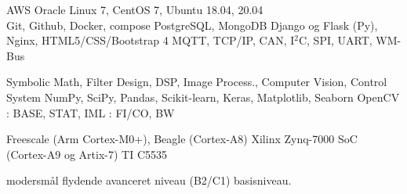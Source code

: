 \documentclass[a4paper]{janus-resume}
\begin{document}
\begin{minipage}[t]{0.49\textwidth}
AWS
\bluebullet{} Oracle Linux 7, CentOS 7, Ubuntu 18.04, 20.04 \\
\bluebullet{} Git, Github, Docker, compose
\bluebullet{} PostgreSQL, MongoDB
\bluebullet{} Django og Flask (Py), Nginx, HTML5/CSS/Bootstrap 4
\bluebullet{} MQTT, TCP/IP, CAN, I$^2$C, SPI, UART, WM-Bus
\sectionspace %

 Symbolic Math, Filter Design, DSP, Image Process., Computer Vision, Control System
\bluebullet {} NumPy, SciPy, Pandas, Scikit-learn, Keras, Matplotlib, Seaborn
\bluebullet {} OpenCV
\bluebullet {}: BASE, STAT, IML
\bluebullet {}: FI/CO, BW 
\sectionspace %

Freescale (Arm Cortex-M0+), Beagle (Cortex-A8)
\bluebullet{} Xilinx Zynq-7000 SoC (Cortex-A9 og Artix-7)
\bluebullet{} TI C5535 \\
\sectionspace %



 modersmål
\bluebullet {} flydende
\bluebullet {} avanceret niveau (B2/C1)
\bluebullet {} basisniveau.

\sectionspace %







\end{minipage} %
\end{document}
